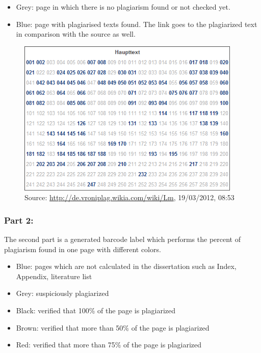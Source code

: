 \begin{itemize}
\item Grey: page in which there is no plagiarism found or not checked yet.
\item Blue: page with plagiarised texts found. The link goes to the plagiarized text in comparison with  the source as well.
\end{itemize}


\begin{figure}[!h]
  \centering
    \includegraphics[width=0.95\textwidth]{images/vroni-pages.png}
  \caption{Source: \url{http://de.vroniplag.wikia.com/wiki/Lm}, 19/03/2012, 08:53}
  \label{fig:vroniPages}
\end{figure}


\subsubsection{Part 2:} 

The second part is a generated barcode label which performs the percent of plagiarism found in one page with 
different colors.

\begin{itemize}
\item Blue: pages which are not calculated in the dissertation such as Index, Appendix, literature list
\item Grey: suspiciously plagiarized
\item Black: verified that 100\% of the page is plagiarized
\item Brown: verified that more than 50\% of the page is plagiarized
\item Red: verified that more than 75\% of the page is plagiarized
\end{itemize}

